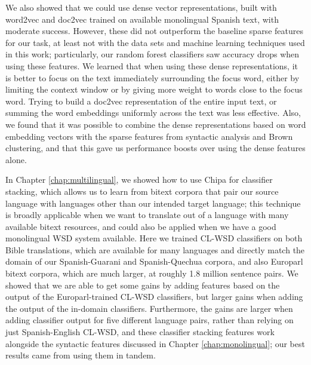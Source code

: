 We also showed that we could use dense vector representations, built with
word2vec and doc2vec trained on available monolingual Spanish text, with
moderate success. However, these did not outperform the baseline sparse
features for our task, at least not with the data sets and machine learning
techniques used in this work; particularly, our random forest classifiers saw
accuracy drops when using these features. We learned that when using these
dense representations, it is better to focus on the text immediately
surrounding the focus word, either by limiting the context window or by giving
more weight to words close to the focus word. Trying to build a doc2vec
representation of the entire input text, or summing the word embeddings
uniformly across the text was less effective. Also, we found that it was
possible to combine the dense representations based on word embedding vectors
with the sparse features from syntactic analysis and Brown clustering, and that
this gave us performance boosts over using the dense features alone.

In Chapter \ref{chap:multilingual}, we showed how to use Chipa for classifier
stacking, which allows us to learn from bitext corpora that pair our source
language with languages other than our intended target language; this technique
is broadly applicable when we want to translate out of a language with many
available bitext resources, and could also be applied when we have a good
monolingual WSD system available. Here we trained CL-WSD classifiers on both
Bible translations, which are available for many languages and directly match
the domain of our Spanish-Guarani and Spanish-Quechua corpora, and also
Europarl bitext corpora, which are much larger, at roughly 1.8 million sentence
pairs. We showed that we are able to get some gains by adding features based on
the output of the Europarl-trained CL-WSD classifiers, but larger gains when
adding the output of the in-domain classifiers. Furthermore, the gains are
larger when adding classifier output for five different language pairs, rather
than relying on just Spanish-English CL-WSD, and these classifier stacking
features work alongside the syntactic features discussed in Chapter
\ref{chap:monolingual}; our best results came from using them in tandem.

